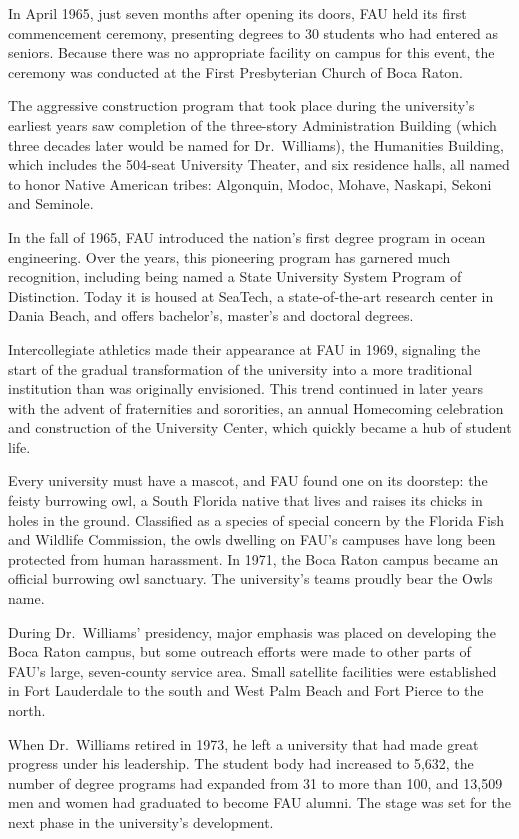 \documentclass[phd, 12pt, print]{fauthesis}
\begin{document}
In April 1965, just seven months after opening its doors, FAU held its first commencement ceremony, presenting degrees to 30 students who had entered as seniors.  Because there was no appropriate facility on campus for this event, the ceremony was conducted at the First Presbyterian Church of Boca Raton.

The aggressive construction program that took place during the university's earliest years saw completion of the three-story Administration Building (which three decades later would be named for Dr.\ Williams), the Humanities Building, which includes the 504-seat University Theater, and six residence halls, all named to honor Native American tribes: Algonquin, Modoc, Mohave, Naskapi, Sekoni and Seminole.

In the fall of 1965, FAU introduced the nation's first degree program in ocean engineering.  Over the years, this pioneering program has garnered much recognition, including being named a State University System Program of Distinction.  Today it is housed at SeaTech, a state-of-the-art research center in Dania Beach, and offers bachelor's, master's and doctoral degrees.

Intercollegiate athletics made their appearance at FAU in 1969, signaling the start of the gradual transformation of the university into a more traditional institution than was originally envisioned.  This trend continued in later years with the advent of fraternities and sororities, an annual Homecoming celebration and construction of the University Center, which quickly became a hub of student life.

Every university must have a mascot, and FAU found one on its doorstep: the feisty burrowing owl, a South Florida native that lives and raises its chicks in holes in the ground.  Classified as a species of special concern by the Florida Fish and Wildlife Commission, the owls dwelling on FAU's campuses have long been protected from human harassment.  In 1971, the Boca Raton campus became an official burrowing owl sanctuary.  The university's teams proudly bear the Owls name.

During Dr.\ Williams' presidency, major emphasis was placed on developing the Boca Raton campus, but some outreach efforts were made to other parts of FAU's large, seven-county service area.  Small satellite facilities were established in Fort Lauderdale to the south and West Palm Beach and Fort Pierce to the north.

When Dr.\ Williams retired in 1973, he left a university that had made great progress under his leadership. The student body had increased to 5,632, the number of degree programs had expanded from 31 to more than 100, and 13,509 men and women had graduated to become FAU alumni.  The stage was set for the next phase in the university's development.
\end{document}
